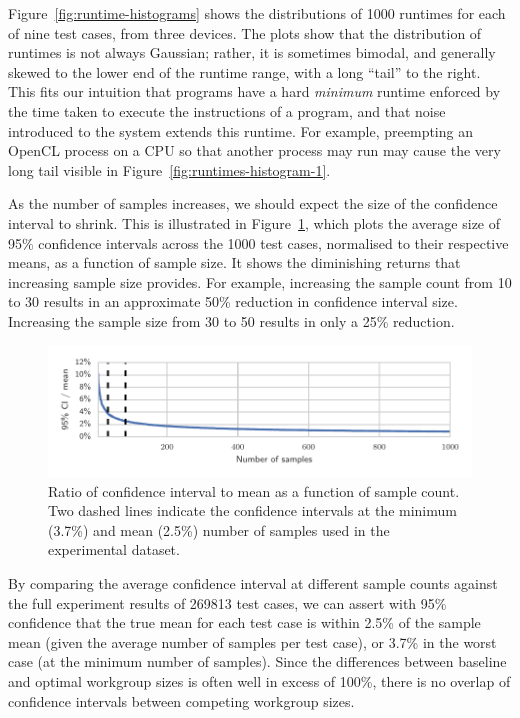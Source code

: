 \documentclass[nonatbib,preprint,9pt]{sigplanconf}
\begin{document}
Figure~\ref{fig:runtime-histograms} shows the distributions of 1000
runtimes for each of nine test cases, from three devices. The plots
show that the distribution of runtimes is not always Gaussian; rather,
it is sometimes bimodal, and generally skewed to the lower end of the
runtime range, with a long ``tail'' to the right. This fits our
intuition that programs have a hard \emph{minimum} runtime enforced by
the time taken to execute the instructions of a program, and that
noise introduced to the system extends this runtime. For example,
preempting an OpenCL process on a CPU so that another process may run
may cause the very long tail visible in
Figure~\ref{fig:runtimes-histogram-1}.

As the number of samples increases, we
should expect the size of the confidence interval to shrink. This is
illustrated in Figure~\ref{fig:ci-trends}, which plots the average
size of 95\% confidence intervals across the 1000 test cases,
normalised to their respective means, as a function of sample
size. It shows the diminishing returns that increasing sample size
provides. For example, increasing the sample count from 10 to 30
results in an approximate 50\% reduction in confidence interval
size. Increasing the sample size from 30 to 50 results in only a
25\% reduction.

\begin{figure}
\centering
\includegraphics[width=\columnwidth]{img/ci_trend}
\caption[Confidence interval size vs.\ sample count]{%
  Ratio of confidence interval to mean as a function of sample
  count. Two dashed lines indicate the confidence intervals at the
  minimum (3.7\%) and mean (2.5\%) number of samples used in the
  experimental dataset.%
}
\label{fig:ci-trends}
\end{figure}

By comparing the average confidence interval at different sample
counts against the full experiment results of 269813 test cases, we
can assert with 95\% confidence that the true mean for each test case
is within 2.5\% of the sample mean (given the average number of
samples per test case), or 3.7\% in the worst case (at the minimum
number of samples). Since the differences between baseline and optimal
workgroup sizes is often well in excess of 100\%, there is no overlap
of confidence intervals between competing workgroup sizes.
\end{document}
